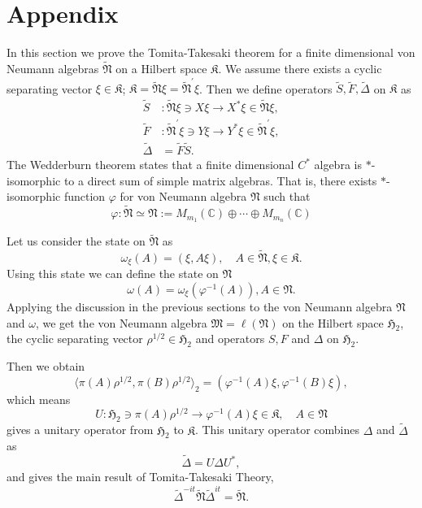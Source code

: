\section{Appendix}
In this section we prove the Tomita-Takesaki theorem for a finite dimensional
von Neumann algebras $\tilde{\mathfrak{N}}$ on a Hilbert space $\mathfrak{K}$.
We assume there exists a cyclic separating vector $\xi\in \mathfrak{K}$;
$\mathfrak{K}=\tilde{\mathfrak{N}}\xi=\tilde{\mathfrak{N}}^\prime\xi$.
Then we define operators $\tilde{S},\tilde{F},\tilde{\Delta}$ on $\mathfrak{K}$ as
$$
\begin{split}
\tilde{S}&:\tilde{\mathfrak{N}}\xi\ni X\xi \to X^\ast \xi \in \tilde{\mathfrak{N}}\xi,\\
\tilde{F}&:\tilde{\mathfrak{N}}^\prime\xi\ni Y\xi \to Y^\ast \xi \in \tilde{\mathfrak{N}}^\prime\xi,\\
\tilde{\Delta}&=\tilde{F}\tilde{S}.
\end{split}
$$
The Wedderburn theorem states that a finite dimensional $C^{\ast}$ algebra is  $\ast$-isomorphic to a direct sum of simple matrix algebras. That is, there exists $\ast$-isomorphic function $\varphi$ for von Neumann algebra $\mathfrak{N}$ such that
$$
\varphi:\tilde{\mathfrak{N}}\simeq \mathfrak{N}:=M_{m_1}(\mathbb{C})\oplus \cdots \oplus M_{m_n}(\mathbb{C})
$$

Let us consider the state on $\tilde{\mathfrak{N}}$ as
$$
\omega_\xi(A)=(\xi,A\xi),\quad A\in \tilde{\mathfrak{N}},\xi\in \mathfrak{K}.
$$
Using this state we can define the state on $\mathfrak{N}$
$$
\omega(A)=\omega_\xi(\varphi^{-1}(A)),A\in \mathfrak{N}.
$$
Applying the discussion in the previous sections to the von Neumann algebra $\mathfrak{N}$ and 
$\omega$, we get
the von Neumann algebra $\mathfrak{M}=\ell (\mathfrak{N})$ on the Hilbert space 
$\mathfrak{H}_2$, the cyclic separating vector $\rho^{1/2}\in \mathfrak{H}_2$
and operators $S, F$ and $\Delta$ on $\mathfrak{H}_2$.

Then we obtain
$$
\langle \pi(A)\rho^{1/2},\pi( B)\rho^{1/2}\rangle_2=(\varphi^{-1}(A)\xi,\varphi^{-1}(B)\xi),
$$
which means
$$
U:\mathfrak{H}_2\ni\pi(A)\rho^{1/2}\to \varphi^{-1}(A)\xi\in\mathfrak{K}, \quad A\in \mathfrak{N}
$$
gives a unitary operator from $\mathfrak{H}_2$ to $\mathfrak{K}$.
This unitary operator combines $\Delta$ and $\tilde{\Delta}$ as
$$
\tilde{\Delta}=U\Delta U^{\ast},
$$
and gives the main result of Tomita-Takesaki Theory,
$$
\tilde{\Delta}^{-it}\tilde{\mathfrak{N}}\tilde{\Delta}^{it}=\tilde{\mathfrak{N}}.
$$


